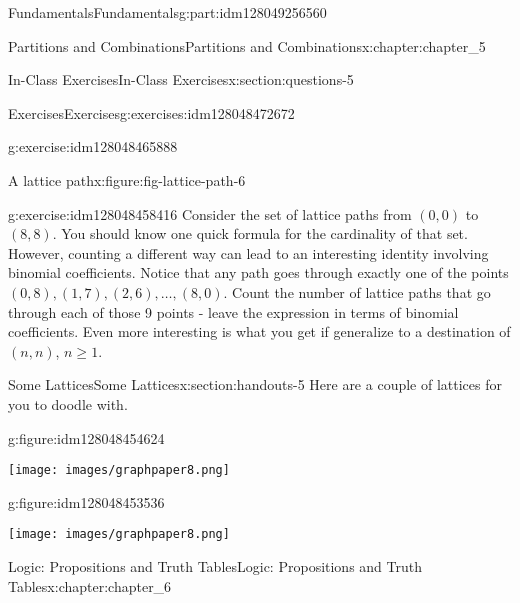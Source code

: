 \documentclass[oneside,10pt,]{book}
\numberwithin{equation}{section}
\begin{document}
\begin{partptx}{Fundamentals}{}{Fundamentals}{}{}{g:part:idm128049256560}
\begin{chapterptx}{Partitions and Combinations}{}{Partitions and Combinations}{}{}{x:chapter:chapter_5}
\begin{sectionptx}{In-Class Exercises}{}{In-Class Exercises}{}{}{x:section:questions-5}
\begin{exercises-subsection}{Exercises}{}{Exercises}{}{}{g:exercises:idm128048472672}
\begin{exercisegroup}
\begin{divisionexerciseeg}{6}{}{}{g:exercise:idm128048465888}
\begin{figureptx}{A lattice path}{x:figure:fig-lattice-path-6}{}
\tcblower
\end{figureptx}%
\end{divisionexerciseeg}%
\begin{divisionexerciseeg}{7}{}{}{g:exercise:idm128048458416}%
Consider the set of lattice paths from \((0,0)\) to \((8,8)\).  You should know one quick formula for the cardinality of that set.  However, counting a different way can lead to an interesting  identity involving binomial coefficients.  Notice that any path goes through exactly one of the points \((0,8), (1,7), (2,6), \dots , (8,0)\).  Count the number of lattice paths that go through each of those 9 points - leave the expression in terms of binomial coefficients.  Even more interesting is what you get if  generalize to a destination of \((n,n)\), \(n \geq 1\).%
\end{divisionexerciseeg}%
\end{exercisegroup}
\par\medskip\noindent
\end{exercises-subsection}
\end{sectionptx}
%
%
\typeout{************************************************}
\typeout{************************************************}
%
\begin{sectionptx}{Some Lattices}{}{Some Lattices}{}{}{x:section:handouts-5}
Here are a couple of lattices for you to doodle with.%
\begin{figureptx}{}{g:figure:idm128048454624}{}%
\begin{image}{0.175}{0.65}{0.175}%
\texttt{[image: images/graphpaper8.png]}
\end{image}%
\tcblower
\end{figureptx}%
\begin{figureptx}{}{g:figure:idm128048453536}{}%
\begin{image}{0.175}{0.65}{0.175}%
\texttt{[image: images/graphpaper8.png]}
\end{image}%
\tcblower
\end{figureptx}%
\end{sectionptx}
\end{chapterptx}
%
\typeout{************************************************}
\typeout{************************************************}
%
\begin{chapterptx}{Logic: Propositions and Truth Tables}{}{Logic: Propositions and Truth Tables}{}{}{x:chapter:chapter_6}
%

\end{chapterptx}
\end{partptx}
\end{document}

